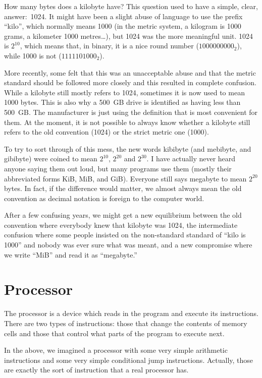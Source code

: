 How many bytes does a kilobyte have? This question used to have a simple,
clear, answer:~1024. It might have been a slight abuse of language to use the
prefix ``kilo'', which normally means 1000 (in the metric system, a kilogram is
1000 grams, a kilometer 1000 metres\ldots), but 1024 was the more meaningful
unit. 1024 is $2^{10}$, which means that, in binary, it is a nice round number
($1000000000_2$), while 1000 is not ($1111101000_2$).

More recently, some felt that this was an unacceptable abuse and that the
metric standard should be followed more closely and this resulted in complete
confusion. While a kilobyte still mostly refers to 1024, sometimes it is now
used to mean 1000 bytes. This is also why a 500~GB drive is identified as
having less than 500~GB. The manufacturer is just using the definition that is
most convenient for them. At the moment, it is not possible to always know
whether a kilobyte still refers to the old convention (1024) or the strict
metric one (1000).

To try to sort through of this mess, the new words kibibyte (and mebibyte, and
gibibyte) were coined to mean $2^{10}$, $2^{20}$ and $2^{30}$. I have actually
never heard anyone saying them out loud, but many programs use them
(mostly their abbreviated forms KiB, MiB, and GiB). Everyone still says
megabyte to mean $2^{20}$ bytes. In fact, if the difference would matter, we
almost always mean the old convention as decimal notation is foreign to the
computer world.

After a few confusing years, we might get a new equilibrium between the old
convention where everybody knew that kilobyte was 1024, the intermediate
confusion where some people insisted on the non-standard standard of ``kilo is
1000'' and nobody was ever sure what was meant, and a new compromise where we
write ``MiB'' and read it as ``megabyte.''

\section{Processor}

The processor is a device which reads in the program and execute its
instructions. There are two types of instructions: those that change the
contents of memory cells and those that control what parts of the program to
execute next.

In the above, we imagined a processor with some very simple arithmetic
instructions and some very simple conditional jump instructions. Actually,
those are exactly the sort of instruction that a real processor has.

